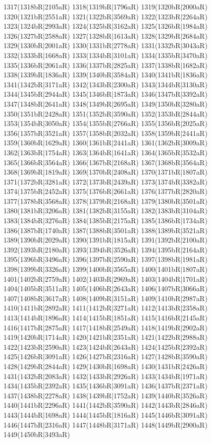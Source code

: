 1317(1318bR|2105aR) 1318(1319bR|1796aR) 1319(1320bR|2000aR) 1320(1321bR|2551aR) 1321(1322bR|3569aR) 1322(1323bR|2264aR) \\1323(1324bR|2993aR) 1324(1325bR|3162aR) 1325(1326bR|1984aR) 1326(1327bR|2588aR) 1327(1328bR|1613aR) 1328(1329bR|2684aR) 1329(1330bR|2001aR) 1330(1331bR|2778aR) 1331(1332bR|3043aR) \\1332(1333bR|1668aR) 1333(1334bR|3101aR) 1334(1335bR|3470aR) 1335(1336bR|2061aR) 1336(1337bR|2825aR) 1337(1338bR|1682aR) 1338(1339bR|1836aR) 1339(1340bR|3584aR) 1340(1341bR|1836aR) \\1341(1342bR|3171aR) 1342(1343bR|2300aR) 1343(1344bR|3130aR) 1344(1345bR|2944aR) 1345(1346bR|1873aR) 1346(1347bR|3392aR) 1347(1348bR|2641aR) 1348(1349bR|2695aR) 1349(1350bR|3280aR) \\1350(1351bR|2428aR) 1351(1352bR|3590aR) 1352(1353bR|2844aR) 1353(1354bR|3050aR) 1354(1355bR|2766aR) 1355(1356bR|2025aR) 1356(1357bR|3521aR) 1357(1358bR|2032aR) 1358(1359bR|2441aR) \\1359(1360bR|1629aR) 1360(1361bR|2441aR) 1361(1362bR|3009aR) 1362(1363bR|1754aR) 1363(1364bR|1641aR) 1364(1365bR|3532aR) 1365(1366bR|3564aR) 1366(1367bR|2168aR) 1367(1368bR|3564aR) \\1368(1369bR|1819aR) 1369(1370bR|2408aR) 1370(1371bR|1807aR) 1371(1372bR|3281aR) 1372(1373bR|2439aR) 1373(1374bR|3382aR) 1374(1375bR|2452aR) 1375(1376bR|2661aR) 1376(1377bR|2820aR) \\1377(1378bR|3568aR) 1378(1379bR|2168aR) 1379(1380bR|3501aR) 1380(1381bR|3206aR) 1381(1382bR|3155aR) 1382(1383bR|3104aR) 1383(1384bR|3276aR) 1384(1385bR|2175aR) 1385(1386bR|1734aR) \\1386(1387bR|1740aR) 1387(1388bR|3501aR) 1388(1389bR|3521aR) 1389(1390bR|2029aR) 1390(1391bR|1815aR) 1391(1392bR|2100aR) 1392(1393bR|2180aR) 1393(1394bR|3526aR) 1394(1395bR|2164aR) \\1395(1396bR|3496aR) 1396(1397bR|2590aR) 1397(1398bR|1981aR) 1398(1399bR|3326aR) 1399(1400bR|3565aR) 1400(1401bR|1807aR) 1401(1402bR|2759aR) 1402(1403bR|2969aR) 1403(1404bR|1701aR) \\1404(1405bR|3511aR) 1405(1406bR|2643aR) 1406(1407bR|3066aR) 1407(1408bR|3617aR) 1408(1409bR|3151aR) 1409(1410bR|2987aR) 1410(1411bR|2892aR) 1411(1412bR|3271aR) 1412(1413bR|2358aR) \\1413(1414bR|1896aR) 1414(1415bR|1851aR) 1415(1416bR|2145aR) 1416(1417bR|2875aR) 1417(1418bR|2549aR) 1418(1419bR|2902aR) 1419(1420bR|1714aR) 1420(1421bR|2351aR) 1421(1422bR|2988aR) \\1422(1423bR|2590aR) 1423(1424bR|2643aR) 1424(1425bR|2392aR) 1425(1426bR|3091aR) 1426(1427bR|2316aR) 1427(1428bR|3590aR) 1428(1429bR|2844aR) 1429(1430bR|1698aR) 1430(1431bR|2426aR) \\1431(1432bR|2083aR) 1432(1433bR|2926aR) 1433(1434bR|1971aR) 1434(1435bR|2392aR) 1435(1436bR|3091aR) 1436(1437bR|2371aR) 1437(1438bR|2278aR) 1438(1439bR|1752aR) 1439(1440bR|3526aR) \\1440(1441bR|2296aR) 1441(1442bR|3590aR) 1442(1443bR|2846aR) 1443(1444bR|1698aR) 1444(1445bR|1816aR) 1445(1446bR|3091aR) 1446(1447bR|2316aR) 1447(1448bR|3171aR) 1448(1449bR|2900aR) \\1449(1450bR|3493aR) 